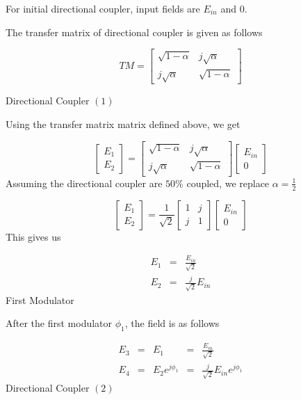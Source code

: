 For initial directional coupler, input fields are $E_{in}$ and $0$.

The transfer matrix of directional coupler is given as follows

$$
TM = \begin{bmatrix}  
\sqrt{1-\alpha} & j\sqrt{\alpha}\\  
j\sqrt{\alpha} & \sqrt{1-\alpha}  
\end{bmatrix} 
$$

 Directional Coupler $(1)$

Using the transfer matrix matrix defined above, we get

$$
\begin{bmatrix}  
E_1\\  
E_2 
\end{bmatrix} = \begin{bmatrix}  
\sqrt{1-\alpha} & j\sqrt{\alpha}\\  
j\sqrt{\alpha} & \sqrt{1-\alpha}  
\end{bmatrix} \begin{bmatrix}  
E_{in}\\  
0  
\end{bmatrix} 
$$
Assuming the directional coupler are $50\%$ coupled, we replace $\alpha = \frac 1 2$ 

$$
\begin{bmatrix}  
E_1\\  
E_2 
\end{bmatrix} = \frac {1} {\sqrt{2}}\begin{bmatrix}  
1 & j\\  
j & 1  
\end{bmatrix} \begin{bmatrix}
E_{in}\\  
0  
\end{bmatrix} 
$$
This gives us

$$
\begin{aligned}
E_1 &=& \frac {E_{in}} {\sqrt{2}} \\
E_2 &=& \frac {j} {\sqrt{2}} E_{in}
\end{aligned}
$$
 First Modulator

After the first modulator $\phi_1$, the field is as follows

$$
\begin{aligned}
E_3 &=& E_1 &=& \frac {E_{in}} {\sqrt{2}} \\
E_4 &=& E_2 e^{j\phi_1} &=& \frac {j} {\sqrt{2}} E_{in}e^{j\phi_1}
\end{aligned}
$$
 Directional Coupler $(2)$

